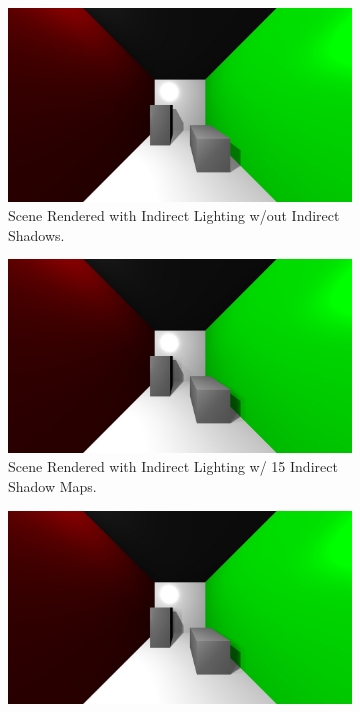 \begin{figure}
        \centering
        \begin{subfigure}[b]{0.75\textwidth}
                \includegraphics[width=\textwidth]{23.jpg}
                \caption{Scene Rendered with Indirect Lighting w/out Indirect Shadows.}
                \label{fig:0indSM}
        \end{subfigure}
        \begin{subfigure}[b]{0.75\textwidth}
                \includegraphics[width=\textwidth]{19.jpg}
                \caption{Scene Rendered with Indirect Lighting w/ 15 Indirect Shadow Maps.}
                \label{fig:15indSM}
        \end{subfigure}
        \begin{subfigure}[b]{0.75\textwidth}
                \includegraphics[width=\textwidth]{20.jpg}

\end{subfigure}
\end{figure}
